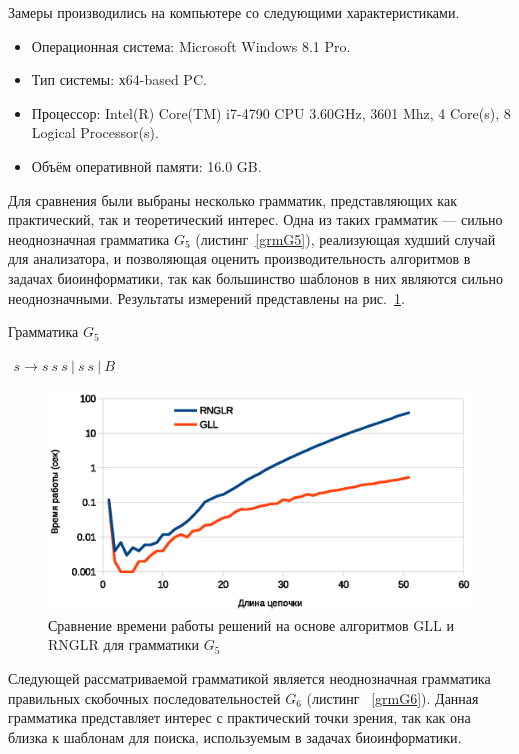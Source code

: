 \documentclass[14pt]{matmex-diploma}
\begin{document}
Замеры производились на компьютере со следующими характеристиками.
\begin{itemize}
\item Операционная система: Microsoft Windows 8.1 Pro.
\item Тип системы: х64-based PC.
\item Процессор: Intel(R) Core(TM) i7-4790 CPU 3.60GHz, 3601 Mhz, 4 Core(s), 8 Logical Processor(s).
\item Объём оперативной памяти: 16.0 GB.
\end{itemize}

Для сравнения были выбраны несколько грамматик, представляющих как практический, так и теоретический интерес. Одна из таких грамматик --- сильно неоднозначная грамматика $G_5$ (листинг~\ref{grmG5}), реализующая худший случай для анализатора, и позволяющая оценить производительность алгоритмов в задачах биоинформатики, так как большинство шаблонов в них являются сильно неоднозначными. Результаты измерений представлены на рис.~\ref{exp1}. 

\begin{listing}
\caption{Грамматика $G_5$}
\label{grmG5}
\centering
$\begin{array}{rl}
s \rightarrow s \ s \ s \ |  \ s \ s \ | \ B 
\end{array}$
\end{listing} 

\begin{figure}
 \centering
 \includegraphics[width=15cm]{pics/UmbLog.eps}
 \caption{Сравнение времени работы решений на основе алгоритмов GLL и RNGLR для грамматики $G_5$}
 \label{exp1}
\end{figure}

Следующей рассматриваемой грамматикой является неоднозначная грамматика правильных скобочных последовательностей $G_6$ (листинг ~\ref{grmG6}). Данная грамматика представляет интерес с практический точки зрения, так как она близка к шаблонам для поиска, используемым в задачах биоинформатики. 
\end{document}
